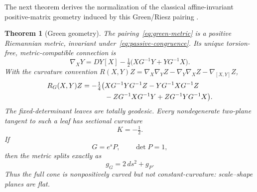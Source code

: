 \documentclass[12pt]{article}
\newtheorem{theorem}{Theorem}[section]
\theoremstyle{definition}
\theoremstyle{remark}
\begin{document}
The next theorem derives the normalization of the classical affine-invariant
positive-matrix geometry induced by this Green/Riesz pairing
\cite{PennecFillardAyache2006,Moakher2005,Bhatia2007,
ThanwerdasPennec2023,HiaiPetz2009}.

\begin{theorem}[Green geometry]\label{thm:green-geometry}
The pairing~\eqref{eq:green-metric} is a positive Riemannian metric,
invariant under~\eqref{eq:passive-congruence}.  Its unique torsion-free,
metric-compatible connection is
\begin{equation}\label{eq:levi-civita}
 \nabla_XY
 =DY[X]-\tfrac12\bigl(XG^{-1}Y+YG^{-1}X\bigr).
\end{equation}
With the curvature convention
$R(X,Y)Z=\nabla_X\nabla_YZ-\nabla_Y\nabla_XZ-\nabla_{[X,Y]}Z$,
\begin{align}
R_G(X,Y)Z=-\tfrac14\bigl(
 &XG^{-1}YG^{-1}Z-YG^{-1}XG^{-1}Z \notag\\
 &-ZG^{-1}XG^{-1}Y+ZG^{-1}YG^{-1}X
\bigr).\label{eq:curvature}
\end{align}
The fixed-determinant leaves are totally geodesic.  Every nondegenerate
two-plane tangent to such a leaf has sectional curvature
\begin{equation}\label{eq:shape-curvature}
 K=-\tfrac12.
\end{equation}
If
\begin{equation}\label{eq:scale-shape-coordinate}
 G=e^sP,\qquad \det P=1,
\end{equation}
then the metric splits exactly as
\begin{equation}\label{eq:metric-product}
 g_G=2\,ds^2+g_P.
\end{equation}
Thus the full cone is nonpositively curved but not constant-curvature:
scale--shape planes are flat.
\end{theorem}
\end{document}
